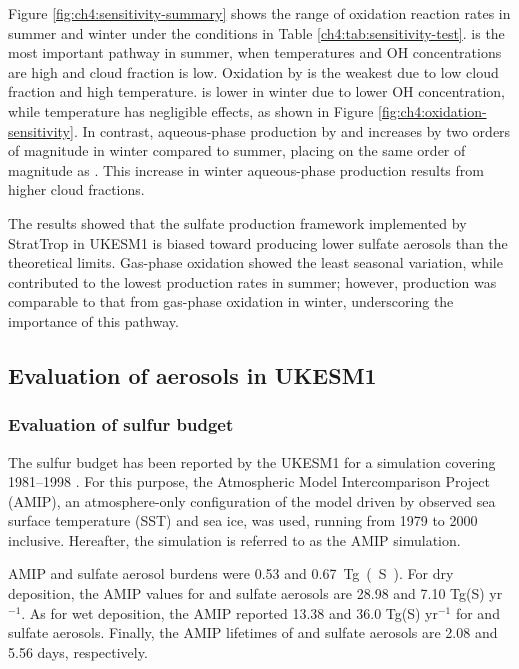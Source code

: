 Figure \ref{fig:ch4:sensitivity-summary} shows the range of  oxidation reaction rates in summer and winter under the conditions in Table \ref{ch4:tab:sensitivity-test}.  is the most important pathway in summer, when temperatures and OH concentrations are high and cloud fraction is low. Oxidation by  is the weakest due to low cloud fraction and high temperature.  is lower in winter due to lower OH concentration, while temperature has negligible effects, as shown in Figure \ref{fig:ch4:oxidation-sensitivity}. In contrast, aqueous-phase production by  and  increases by two orders of magnitude in winter compared to summer, placing  on the same order of magnitude as . This increase in winter aqueous-phase production results from higher cloud fractions. 

The results showed that the sulfate production framework implemented by StratTrop in UKESM1 is biased toward producing lower sulfate aerosols than the theoretical limits. Gas-phase oxidation showed the least seasonal variation, while  contributed to the lowest production rates in summer; however, production was comparable to that from gas-phase oxidation in winter, underscoring the importance of this pathway.


\subsection{Evaluation of aerosols in UKESM1}

\subsubsection{Evaluation of sulfur budget}

The sulfur budget has been reported by the UKESM1 for a simulation covering 1981--1998 \citep{mulcahyDescriptionEvaluationAerosol2020}. For this purpose, the Atmospheric Model Intercomparison Project (AMIP), an atmosphere-only configuration of the model driven by observed sea surface temperature (SST) and sea ice, was used, running from 1979 to 2000 inclusive. Hereafter, the simulation is referred to as the AMIP simulation. 

AMIP  and sulfate aerosol burdens were 0.53 and \qty{0.67}{Tg(S)}. For dry deposition, the AMIP values for  and sulfate aerosols are 28.98 and 7.10 Tg(S) yr$^{-1}$. As for wet deposition, the AMIP reported 13.38 and 36.0 Tg(S) yr$^{-1}$ for  and sulfate aerosols. Finally, the AMIP lifetimes of  and sulfate aerosols are 2.08 and 5.56 days, respectively.

